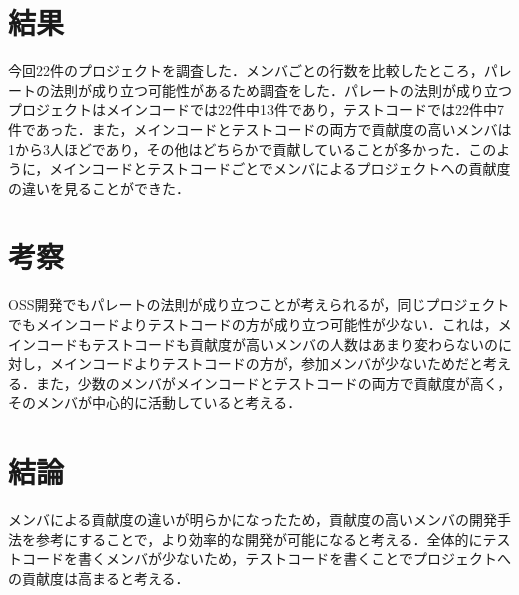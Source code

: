 \documentclass[uplatex,twocolumn,dvipdfmx]{jsarticle}
\begin{document}
\section{結果}

今回22件のプロジェクトを調査した．メンバごとの行数を比較したところ，パレートの法則が成り立つ可能性があるため調査をした．パレートの法則が成り立つプロジェクトはメインコードでは22件中13件であり，テストコードでは22件中7件であった．また，メインコードとテストコードの両方で貢献度の高いメンバは1から3人ほどであり，その他はどちらかで貢献していることが多かった．このように，メインコードとテストコードごとでメンバによるプロジェクトへの貢献度の違いを見ることができた．


\section{考察}

OSS開発でもパレートの法則が成り立つことが考えられるが，同じプロジェクトでもメインコードよりテストコードの方が成り立つ可能性が少ない．これは，メインコードもテストコードも貢献度が高いメンバの人数はあまり変わらないのに対し，メインコードよりテストコードの方が，参加メンバが少ないためだと考える．また，少数のメンバがメインコードとテストコードの両方で貢献度が高く，そのメンバが中心的に活動していると考える．


\section{結論}

メンバによる貢献度の違いが明らかになったため，貢献度の高いメンバの開発手法を参考にすることで，より効率的な開発が可能になると考える．全体的にテストコードを書くメンバが少ないため，テストコードを書くことでプロジェクトへの貢献度は高まると考える．



\end{document}
